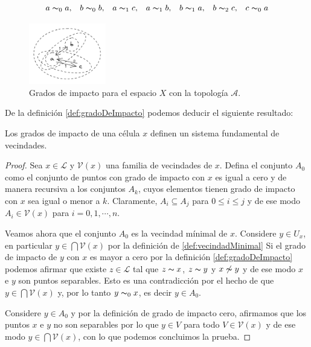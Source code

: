 $$\begin{array}{ccccccc}
    a\thicksim_0 a, & b\thicksim_0 b, & a\thicksim_1 c, & a\thicksim_1 b, &
    b\thicksim_1 a, & b\thicksim_2 c, & c\thicksim_0 a
\end{array}$$
\begin{figure}[h]
  \centering
    \includegraphics[width=0.3\textwidth]{Imagenes/grados_de_impacto.PNG}
  \caption{Grados de impacto para el espacio $X$ con la topología $\mathcal{A}$.}
  \label{fig:gradoImpacto}
\end{figure}

De la definición \ref{def:gradoDeImpacto} podemos deducir el siguiente resultado:

\begin{teorema}\label{teo:gradeosDeImpactoImplicaSFV}
Los grados de impacto de una célula $x$ definen un sistema fundamental de vecindades.
\end{teorema}
\begin{proof}
Sea $x\in\mathcal{L}$ y $\mathcal{V}(x)$ una familia de vecindades de $x$. Defina el conjunto $A_0$ como el conjunto de puntos con grado de impacto con $x$ es igual a cero y de manera recursiva a los conjuntos $A_k$, cuyos elementos tienen grado de impacto con $x$ sea igual o menor a $k$. Claramente, $A_i\subseteq A_j$ para $0\leq i\leq j$ y de ese modo $A_i\in\mathcal{V}(x)$ para $i=0,1,\cdots,n$.

Veamos ahora que el conjunto $A_0$ es la vecindad mínimal de $x$. Considere $y\in U_x$, en particular $y\in\bigcap\mathcal{V}(x)$ por la definición de \ref{def:vecindadMinimal} Si el grado de impacto de $y$ con $x$ es mayor a cero por la definición \ref{def:gradoDeImpacto} podemos afirmar que existe $z\in\mathcal{L}$ tal que $z\thicksim x$, $z\thicksim y$ y $x\not\thicksim y$ y de ese modo $x$ e $y$ son puntos separables. Esto es una contradicción por el hecho de que $y\in \bigcap \mathcal{V}(x)$ y, por lo tanto $y\thicksim_0 x$, es decir $y\in A_0$.

Considere $y\in A_0$ y por la definición de grado de impacto cero, afirmamos que los puntos $x$ e $y$ no son separables por lo que $y\in V$ para todo $V\in\mathcal{V}(x)$ y de ese modo $y\in\bigcap\mathcal{V}(x)$, con lo que podemos concluimos la prueba.
\end{proof}

